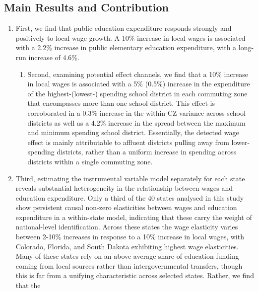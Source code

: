 \documentclass[
  10pt,
]{article}
\providecommand{\tightlist}{%
  \setlength{\itemsep}{0pt}\setlength{\parskip}{0pt}}
\begin{document}
\subsection{Main Results and
Contribution}\label{main-results-and-contribution}

\begin{enumerate}
\def\labelenumi{\arabic{enumi}.}
\item
  First, we find that public education expenditure responds strongly and
  positively to local wage growth. A 10\% increase in local wages is
  associated with a 2.2\% increase in public elementary education
  expenditure, with a long-run increase of 4.6\%.

  \begin{enumerate}
  \def\labelenumii{\arabic{enumii}.}
  \setcounter{enumii}{1}
  \tightlist
  \item
    Second, examining potential effect channels, we find that a 10\%
    increase in local wages is associated with a 5\% (0.5\%) increase in
    the expenditure of the highest-(lowest-) spending school district in
    each commuting zone that encompasses more than one school district.
    This effect is corroborated in a 0.3\% increase in the within-CZ
    variance across school districts as well as a 4.2\% increase in the
    spread between the maximum and minimum spending school district.
    Essentially, the detected wage effect is mainly attributable to
    affluent districts pulling away from lower-spending districts,
    rather than a uniform increase in spending across districts within a
    single commuting zone.
  \end{enumerate}
\item
  Third, estimating the instrumental variable model separately for each
  state reveals substantial heterogeneity in the relationship between
  wages and education expenditure. Only a third of the 40 states
  analysed in this study show persistent causal non-zero elasticities
  between wages and education expenditure in a within-state model,
  indicating that these carry the weight of national-level
  identification. Across these states the wage elasticity varies between
  2-10\% increases in response to a 10\% increase in local wages, with
  Colorado, Florida, and South Dakota exhibiting highest wage
  elasticities. Many of these states rely on an above-average share of
  education funding coming from local sources rather than
  intergovernmental transfers, though this is far from a unifying
  characteristic across selected states. Rather, we find that the

\end{enumerate}
\end{document}

